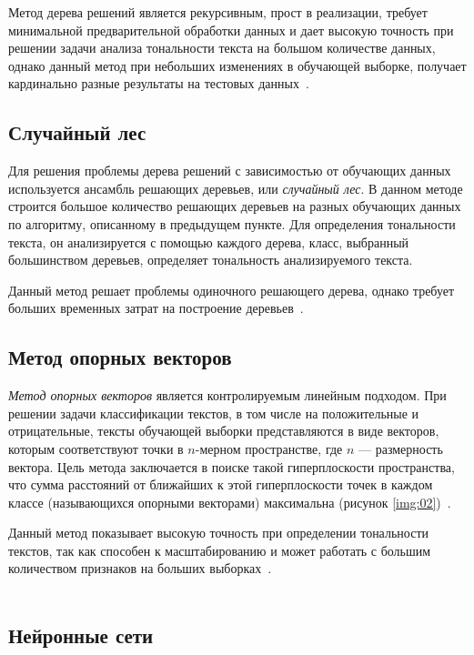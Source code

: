 Метод дерева решений является рекурсивным, прост в реализации, требует
минимальной предварительной обработки данных и дает высокую точность при
решении задачи анализа тональности текста на большом количестве данных, однако
данный метод при небольших изменениях в обучающей выборке, получает
кардинально разные результаты на тестовых данных~\cite{article05}.

\subsection{Случайный лес}

Для решения проблемы дерева решений с зависимостью от обучающих данных
используется ансамбль решающих деревьев, или \textit{случайный лес}.
В данном методе строится большое количество решающих деревьев на разных
обучающих данных по алгоритму, описанному в предыдущем пункте. Для определения
тональности текста, он анализируется с помощью каждого дерева, класс, выбранный
большинством деревьев, определяет тональность анализируемого текста.

Данный метод решает проблемы одиночного решающего дерева, однако требует больших
временных затрат на построение деревьев~\cite{article05}.

\subsection{Метод опорных векторов}

\textit{Метод опорных векторов} является контролируемым линейным подходом. При
решении задачи классификации текстов, в том числе на положительные и
отрицательные, тексты обучающей выборки представляются в виде векторов, которым
соответствуют точки в $n$-мерном пространстве, где $n$ --- размерность вектора.
Цель метода заключается в поиске такой гиперплоскости пространства, что сумма
расстояний от ближайших к этой гиперплоскости точек в каждом классе
(называющихся опорными векторами) максимальна (рисунок
\ref{img:02})~\cite{article11}.


Данный метод показывает высокую точность при определении тональности текстов,
так как способен к масштабированию и может работать с большим количеством
признаков на больших выборках~\cite{article05}.
~\\
~\\

\subsection{Нейронные сети}

